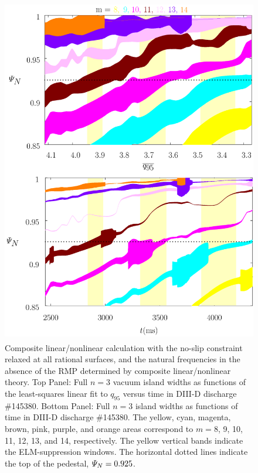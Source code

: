 \documentclass[12pt,prb,aps]{revtex4-1}
\begin{document}
\begin{figure}
\includegraphics[height=6in]{fig10.pdf}
\caption{Composite linear/nonlinear calculation with the no-slip constraint relaxed at all rational surfaces, and  the natural frequencies
in the absence of the RMP determined by composite linear/nonlinear theory. Top Panel: Full  $n=3$ vacuum island widths as functions of the least-squares linear fit to $q_{95}$ versus time 
in   DIII-D discharge \#145380.
Bottom Panel:  Full $n=3$ island widths as functions of time
in   DIII-D discharge \#145380. The yellow, cyan, magenta, brown, pink,
purple, and orange  areas correspond to $m=8$, 9, 10, 11, 12, 13, and 14, respectively. The yellow vertical bands indicate the ELM-suppression windows. 
The horizontal dotted lines indicate the top of the pedestal, ${\mit\Psi}_N=0.925$.} \label{fig10}
\end{figure}
\end{document}
